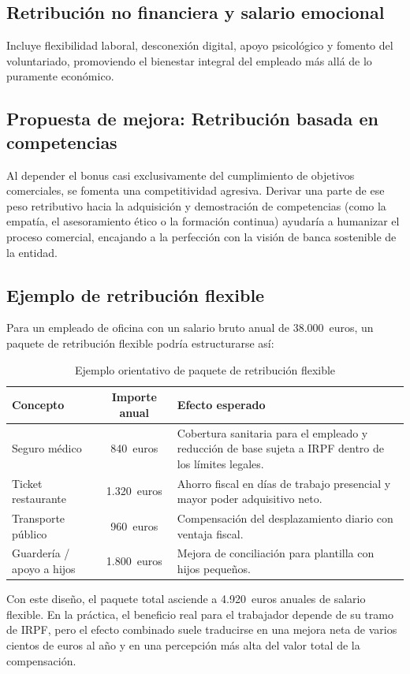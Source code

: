 \subsection{Retribución no financiera y salario emocional}
Incluye flexibilidad laboral, desconexión digital, apoyo psicológico y fomento del voluntariado, promoviendo el bienestar integral del empleado más allá de lo puramente económico.

\subsection*{Propuesta de mejora: Retribución basada en competencias}
Al depender el bonus casi exclusivamente del cumplimiento de objetivos comerciales, se fomenta una competitividad agresiva. Derivar una parte de ese peso retributivo hacia la adquisición y demostración de competencias (como la empatía, el asesoramiento ético o la formación continua) ayudaría a humanizar el proceso comercial, encajando a la perfección con la visión de banca sostenible de la entidad.

\subsection*{Ejemplo de retribución flexible}
\begin{bloquedemejora}
    
Para un empleado de oficina con un salario bruto anual de 38.000~euros,
un paquete de retribución flexible podría estructurarse así:

\begin{table}[H]
\centering
\small
\caption{Ejemplo orientativo de paquete de retribución flexible}
\label{tab:ejemplo-retribucion-flexible}
\begin{tabularx}{\textwidth}{|X|c|X|}
\hline
\textbf{Concepto} & \textbf{Importe anual} & \textbf{Efecto esperado} \\
\hline
Seguro médico & 840~euros & Cobertura sanitaria para el empleado y reducción de base sujeta a IRPF dentro de los límites legales. \\
\hline
Ticket restaurante & 1.320~euros & Ahorro fiscal en días de trabajo presencial y mayor poder adquisitivo neto. \\
\hline
Transporte público & 960~euros & Compensación del desplazamiento diario con ventaja fiscal. \\
\hline
Guardería / apoyo a hijos & 1.800~euros & Mejora de conciliación para plantilla con hijos pequeños. \\
\hline
\end{tabularx}
\end{table}

Con este diseño, el paquete total asciende a 4.920~euros anuales de salario
flexible. En la práctica, el beneficio real para el trabajador depende de su
tramo de IRPF, pero el efecto combinado suele traducirse en una mejora neta
de varios cientos de euros al año y en una percepción más alta del valor total
de la compensación.

\end{bloquedemejora}

